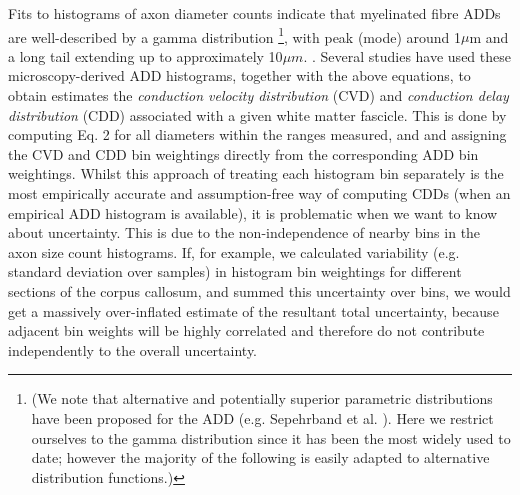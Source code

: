 Fits to histograms of axon diameter counts indicate that myelinated fibre ADDs are well-described by a gamma distribution
\footnote{(We note that alternative and potentially superior parametric distributions have been proposed for the ADD (e.g. Sepehrband et al. ). 
Here we restrict ourselves to the gamma distribution since it has been the most widely used to date; however the majority of the following is easily adapted to alternative distribution functions.)}, with peak (mode) around 1$\mu$m and a long tail extending up to approximately 10$\mu m$. \citep{aboitiz1992fiber}. Several studies have used these microscopy-derived ADD histograms, together with the above equations, to obtain estimates the \textit{conduction velocity distribution} (CVD) and \textit{conduction delay distribution} (CDD) associated with a given white matter fascicle. This is done by computing Eq. 2 for all diameters within the ranges measured, and and assigning the CVD and CDD bin weightings directly from the corresponding ADD bin weightings. Whilst this approach of treating each histogram bin separately is the most empirically accurate and assumption-free way of computing CDDs (when an empirical ADD histogram is available), it is problematic when we want to know about uncertainty. This is due to the non-independence of nearby bins in the axon size count histograms. If, for example, we calculated variability (e.g. standard deviation over samples) in histogram bin weightings for different sections of the corpus callosum, and summed this uncertainty over bins, we would get a massively over-inflated estimate of the resultant total uncertainty, because adjacent bin weights will be highly correlated and therefore do not contribute independently to the overall uncertainty. 
